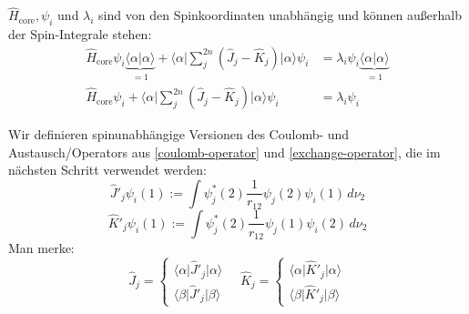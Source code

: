 $\hat{H}_{\text{core}}, \psi_i$ und $\lambda_i$ sind von den Spinkoordinaten unabhängig und
können außerhalb der Spin-Integrale stehen:
\begin{align}
  \hat{H}_{\text{core}} \psi_i \underbrace{\langle \alpha \vert \alpha \rangle}_{=1} +
  \langle \alpha \vert \sum_j^{2n} 
  \left( \hat{J}_j - \hat{K}_j \right) \vert \alpha \rangle \psi_i 
  &= \lambda_i \psi_i \underbrace{\langle \alpha \vert \alpha \rangle}_{=1} \nonumber\\
  \hat{H}_{\text{core}} \psi_i + \langle \alpha \vert \sum_j^{2n}
  \left( \hat{J}_j - \hat{K}_j \right) \vert \alpha \rangle \psi_i 
  &= \lambda_i \psi_i
\end{align}

Wir definieren spinunabhängige Versionen des Coulomb- und Austausch\-/Operators
aus \cref{coulomb-operator} und \cref{exchange-operator},
die im nächsten Schritt verwendet werden:
\begin{equation}\label{spinless-coulomb-operator}
    \hat{J}'_j \psi_i(1):= 
    \int \psi_j^*(2) \frac{1}{r_{12}} \psi_j(2) \psi_i(1) \,d\nu_2 
\end{equation}
\begin{equation}\label{spinless-exchange-operator}
    \hat{K}'_j \psi_i(1) :=
  \int \psi_j^*(2) \frac{1}{r_{12}} \psi_j(1) \psi_i(2) \,d\nu_2
\end{equation}
Man merke:
\begin{equation}
    \hat{J}_j = \begin{cases}
        \langle \alpha \vert \hat{J}'_j \vert \alpha \rangle\\
        \langle \beta \vert \hat{J}'_j \vert \beta \rangle
    \end{cases}\quad
    \hat{K}_j = \begin{cases}
        \langle \alpha \vert \hat{K}'_j \vert \alpha \rangle\\
        \langle \beta \vert \hat{K}'_j \vert \beta \rangle
    \end{cases}
\end{equation}

